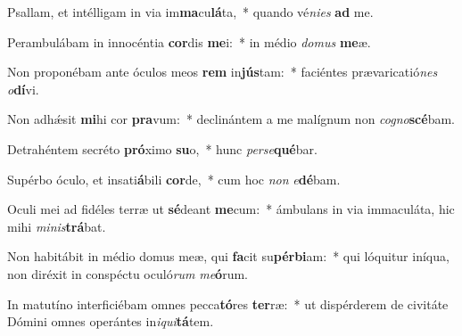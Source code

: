 \item Psallam, et intélligam in via im\textbf{ma}cu\textbf{lá}ta,~* quando vé\textit{ni}\textit{es} \textbf{ad} me.
\item Perambulábam in innocéntia \textbf{cor}dis \textbf{me}i:~* in médio \textit{do}\textit{mus} \textbf{me}æ.
\item Non proponébam ante óculos meos \textbf{rem} in\textbf{jús}tam:~* faciéntes prævaricatió\textit{nes} \textit{o}\textbf{dí}vi.
\item Non adhǽsit \textbf{mi}hi cor \textbf{pra}vum:~* declinántem a me malígnum non \textit{co}\textit{gno}\textbf{scé}bam.
\item Detrahéntem secréto \textbf{pró}ximo \textbf{su}o,~* hunc \textit{per}\textit{se}\textbf{qué}bar.
\item Supérbo óculo, et insati\textbf{á}bili \textbf{cor}de,~* cum hoc \textit{non} \textit{e}\textbf{dé}bam.
\item Oculi mei ad fidéles terræ ut \textbf{sé}deant \textbf{me}cum:~* ámbulans in via immaculáta, hic mihi \textit{mi}\textit{nis}\textbf{trá}bat.
\item Non habitábit in médio domus meæ, qui \textbf{fa}cit su\textbf{pér}\textbf{bi}am:~* qui lóquitur iníqua, non diréxit in conspéctu oculó\textit{rum} \textit{me}\textbf{ó}rum.
\item In matutíno interficiébam omnes pecca\textbf{tó}res \textbf{ter}ræ:~* ut dispérderem de civitáte Dómini omnes operántes in\textit{i}\textit{qui}\textbf{tá}tem.
